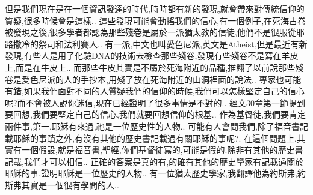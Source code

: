 \documentclass{book}
\begin{document}
但是我們現在是在一個資訊發達的時代,時時都有新的發現,就會帶來對傳統信仰的質疑,很多時候會是這樣..
這些發現可能會動搖我們的信心,有一個例子,在死海古卷被發現之後,很多學者都認為那些殘卷是屬於一派猶太教的信徒,他們不是很服從耶路撒冷的祭司和法利賽人..
有一派,中文也叫愛色尼派,英文是Atheist,但是最近有新發現,有些人是用了化驗DNA的技術去檢查那些殘卷,發現有些殘卷不是寫在羊皮上,而是在牛皮上..
而那些牛皮其實是不屬於死海附近的品種,推翻了以前說那些殘卷是愛色尼派的人的手抄本,用殘了放在死海附近的山洞裡面的說法..
專家也可能有錯,如果我們面對不同的人質疑我們的信仰的時候,我們可以怎樣堅定自己的信心呢?而不會被人說你迷信,現在已經證明了很多事情是不對的..
經文30章第一節提到要回想,我們要堅定自己的信心,我們就要回想信仰的根基..
作為基督徒,我們要肯定兩件事,第一,耶穌有來過,祂是一位歷史性的人物..
可能有人會問我們,除了福音書記載耶穌的事蹟之外,有沒有其他的歷史書記載過有關耶穌的事呢?.
在這個問題上,其實有一個假設,就是福音書,聖經,你們基督徒寫的,可能是假的.除非有其他的歷史書記載,我們才可以相信..
正確的答案是真的有,的確有其他的歷史學家有記載過關於耶穌的事,證明耶穌是一位歷史的人物..
有一位猶太歷史學家,我翻譯他為約斯弗,約斯弗其實是一個很有學問的人..
\end{document}
